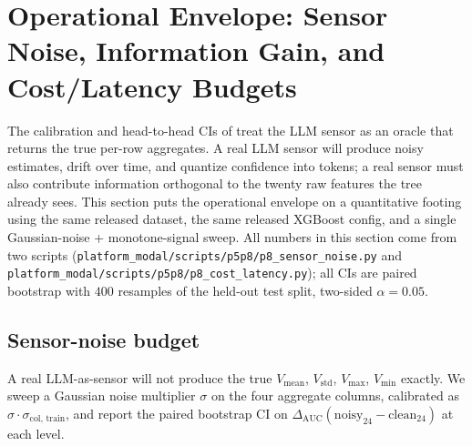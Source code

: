\section{Operational Envelope: Sensor Noise, Information Gain, and Cost/Latency Budgets}
\label{sec:p8-evidence-noise}

The calibration and head-to-head CIs of  treat the
LLM sensor as an oracle that returns the true per-row aggregates. A real
LLM sensor will produce noisy estimates, drift over time, and quantize
confidence into tokens; a real sensor must also contribute information
orthogonal to the twenty raw features the tree already sees. This section
puts the operational envelope on a quantitative footing using the same
released dataset, the same released XGBoost config, and a single
Gaussian-noise + monotone-signal sweep. All numbers in this section come
from two scripts (\texttt{platform\_modal/scripts/p5p8/p8\_sensor\_noise.py} and
\texttt{platform\_modal/scripts/p5p8/p8\_cost\_latency.py}); all CIs are paired bootstrap
with $400$ resamples of the held-out test split, two-sided $\alpha{=}0.05$.

\subsection{Sensor-noise budget}

A real LLM-as-sensor will not produce the true $V_{\text{mean}}$,
$V_{\text{std}}$, $V_{\text{max}}$, $V_{\text{min}}$ exactly. We sweep a
Gaussian noise multiplier $\sigma$ on the four aggregate columns,
calibrated as $\sigma \cdot \sigma_{\text{col, train}}$, and report the
paired bootstrap CI on
$\Delta_{\text{AUC}}(\text{noisy}_{24} - \text{clean}_{24})$ at each
level.


